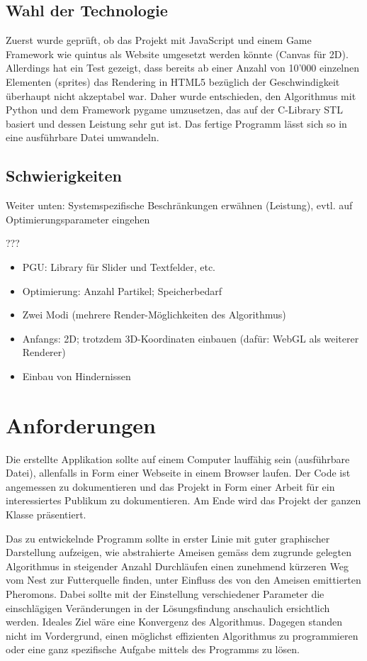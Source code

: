 \subsection{Wahl der Technologie}

Zuerst wurde geprüft, ob das Projekt mit JavaScript und einem Game Framework wie quintus als Website umgesetzt werden könnte (Canvas für 2D). Allerdings hat ein Test gezeigt, dass bereits ab einer Anzahl von 10'000 einzelnen Elementen (sprites) das Rendering in HTML5 bezüglich der Geschwindigkeit überhaupt nicht akzeptabel war. Daher wurde entschieden, den Algorithmus mit Python und dem Framework pygame umzusetzen, das auf der C-Library STL basiert und dessen Leistung sehr gut ist. Das fertige Programm lässt sich so in eine ausführbare Datei umwandeln.



\subsection{Schwierigkeiten}

Weiter unten: Systemspezifische Beschränkungen erwähnen (Leistung), evtl. auf Optimierungsparameter eingehen

???
\begin{itemize}[noitemsep]
\item PGU: Library für Slider und Textfelder, etc.
\item Optimierung: Anzahl Partikel; Speicherbedarf
\item Zwei Modi (mehrere Render-Möglichkeiten des Algorithmus)
\item Anfangs: 2D; trotzdem 3D-Koordinaten einbauen (dafür: WebGL als weiterer Renderer)
\item Einbau von Hindernissen
\end{itemize}




\section{Anforderungen}

Die erstellte Applikation sollte auf einem Computer lauffähig sein (ausführbare Datei), allenfalls in Form einer Webseite in einem Browser laufen. Der Code ist angemessen zu dokumentieren und das Projekt in Form einer Arbeit für ein interessiertes Publikum zu dokumentieren. Am Ende wird das Projekt der ganzen Klasse präsentiert.

Das zu entwickelnde Programm sollte in erster Linie mit guter graphischer Darstellung aufzeigen, wie abstrahierte Ameisen gemäss dem zugrunde gelegten Algorithmus in steigender Anzahl Durchläufen einen zunehmend kürzeren Weg vom Nest zur Futterquelle finden, unter Einfluss des von den Ameisen emittierten Pheromons. Dabei sollte mit der Einstellung verschiedener Parameter die einschlägigen Veränderungen in der Lösungsfindung anschaulich ersichtlich werden. Ideales Ziel wäre eine Konvergenz des Algorithmus. Dagegen standen nicht im Vordergrund, einen möglichst effizienten Algorithmus zu programmieren oder eine ganz spezifische Aufgabe mittels des Programms zu lösen. \\



